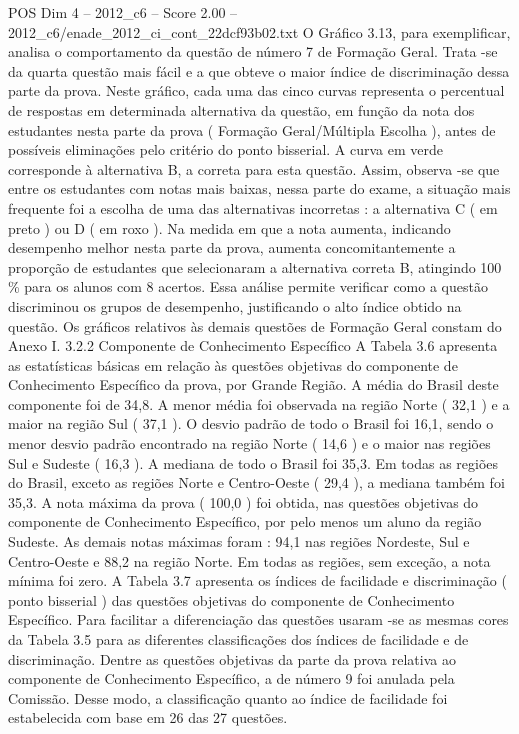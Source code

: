 \begin{textsample}{POS Dim 4 – 2012\_c6 – Score 2.00 – 2012\_c6/enade\_2012\_ci\_cont\_22dcf93b02.txt}
O Gráfico 3.13, para exemplificar, analisa o comportamento da questão de número 7 de Formação Geral.
Trata -se da quarta questão mais fácil e a que obteve o maior índice de discriminação dessa parte da prova.
Neste gráfico, cada uma das cinco curvas representa o percentual de respostas em determinada alternativa da questão, em função da nota dos estudantes nesta parte da prova ( Formação Geral/Múltipla Escolha ), antes de possíveis eliminações pelo critério do ponto bisserial.
A curva em verde corresponde à alternativa B, a correta para esta questão.
Assim, observa -se que entre os estudantes com notas mais baixas, nessa parte do exame, a situação mais frequente foi a escolha de uma das alternativas incorretas : a alternativa C ( em preto ) ou D ( em roxo ).
Na medida em que a nota aumenta, indicando desempenho melhor nesta parte da prova, aumenta concomitantemente a proporção de estudantes que selecionaram a alternativa correta B, atingindo 100 \% para os alunos com 8 acertos.
Essa análise permite verificar como a questão discriminou os grupos de desempenho, justificando o alto índice obtido na questão.
Os gráficos relativos às demais questões de Formação Geral constam do Anexo I. 3.2.2 Componente de Conhecimento Específico A Tabela 3.6 apresenta as estatísticas básicas em relação às questões objetivas do componente de Conhecimento Específico da prova, por Grande Região.
A média do Brasil deste componente foi de 34,8.
A menor média foi observada na região Norte ( 32,1 ) e a maior na região Sul ( 37,1 ).
O desvio padrão de todo o Brasil foi 16,1, sendo o menor desvio padrão encontrado na região Norte ( 14,6 ) e o maior nas regiões Sul e Sudeste ( 16,3 ).
A mediana de todo o Brasil foi 35,3.
Em todas as regiões do Brasil, exceto as regiões Norte e Centro-Oeste ( 29,4 ), a mediana também foi 35,3.
A nota máxima da prova ( 100,0 ) foi obtida, nas questões objetivas do componente de Conhecimento Específico, por pelo menos um aluno da região Sudeste.
As demais notas máximas foram : 94,1 nas regiões Nordeste, Sul e Centro-Oeste e 88,2 na região Norte.
Em todas as regiões, sem exceção, a nota mínima foi zero.
A Tabela 3.7 apresenta os índices de facilidade e discriminação ( ponto bisserial ) das questões objetivas do componente de Conhecimento Específico.
Para facilitar a diferenciação das questões usaram -se as mesmas cores da Tabela 3.5 para as diferentes classificações dos índices de facilidade e de discriminação.
Dentre as questões objetivas da parte da prova relativa ao componente de Conhecimento Específico, a de número 9 foi anulada pela Comissão.
Desse modo, a classificação quanto ao índice de facilidade foi estabelecida com base em 26 das 27 questões.

\end{textsample}
